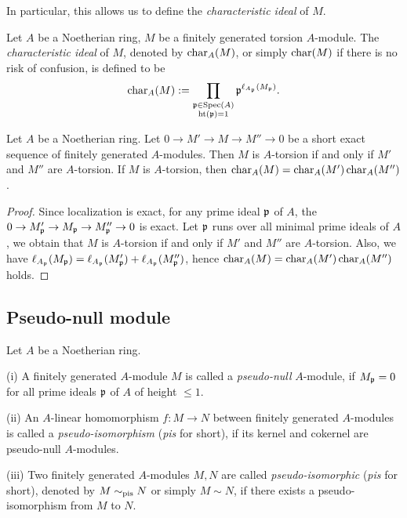In particular, this allows us to define the \emph{characteristic ideal} of $M$.

\begin{definition}
\label{char-ideal}
Let $A$ be a Noetherian ring, $M$ be a
finitely generated torsion $A$-module.
The \emph{characteristic ideal} of $M$,
denoted by $\operatorname{char}_A(M)$, or simply $\operatorname{char}(M)$ if there is no risk of confusion, is defined to be
$$
\operatorname{char}_A(M):=\prod_{\substack{{\mathfrak{p}}\in{\mathrm{Spec}}(A)\\
{\mathrm{ht}}({\mathfrak{p}})=1}}{\mathfrak{p}}^{\ell_{A_{\mathfrak{p}}}(M_{\mathfrak{p}})}.
$$
\end{definition}

\begin{prop}
\label{char-ideal-additive}
Let $A$ be a Noetherian ring.
Let $0\to M'\to M\to M''\to 0$ be a short exact sequence of finitely generated $A$-modules. Then $M$ is $A$-torsion if and only if $M'$ and $M''$ are $A$-torsion.
If $M$ is $A$-torsion, then $\operatorname{char}_A(M)=\operatorname{char}_A(M')\operatorname{char}_A(M'')$.
\end{prop}

\begin{proof}
Since localization is exact, for any prime ideal ${\mathfrak{p}}$ of $A$,
the $0\to M_{\mathfrak{p}}'\to M_{\mathfrak{p}}\to M_{\mathfrak{p}}''\to 0$ is exact.
Let ${\mathfrak{p}}$ runs over all minimal prime ideals of $A$,
we obtain that $M$ is $A$-torsion if and only if $M'$ and $M''$ are $A$-torsion.
Also, we have $\ell_{A_{\mathfrak{p}}}(M_{\mathfrak{p}})=\ell_{A_{\mathfrak{p}}}(M_{\mathfrak{p}}')+\ell_{A_{\mathfrak{p}}}(M_{\mathfrak{p}}'')$,
hence $\operatorname{char}_A(M)=\operatorname{char}_A(M')\operatorname{char}_A(M'')$ holds.
\end{proof}

\subsection{Pseudo-null module}

\begin{definition}
\label{pseudo-null}
\leanok
Let $A$ be a Noetherian ring.

{\rm(i)}
A finitely generated $A$-module $M$ is called a \emph{pseudo-null} $A$-module,
if $M_{\mathfrak{p}}=0$ for all prime ideals ${\mathfrak{p}}$ of $A$ of height $\leq 1$.

{\rm(ii)}
An $A$-linear homomorphism $f:M\to N$ between finitely generated $A$-modules
is called a \emph{pseudo-isomorphism} (\emph{pis} for short),
if its kernel and cokernel are pseudo-null $A$-modules.

{\rm(iii)}
Two finitely generated $A$-modules $M,N$ are called
\emph{pseudo-isomorphic} (\emph{pis} for short),
denoted by $M\sim_{\mathrm{pis}} N$ or simply $M\sim N$,
if there exists a pseudo-isomorphism from $M$ to $N$.
\end{definition}

